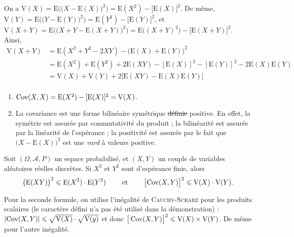 \begin{prv}
	On a $\mathrm{V}(X) = \mathrm{E}\big(\big(X - \mathrm{E}(X)\big)^2\big) = \mathrm{E}(X^2) - \big[\mathrm{E}(X)\big]^2$. De même, $\mathrm{V}(Y) = \mathrm{E}\big(\big(Y - \mathrm{E}(Y)\big)^2\big) = \mathrm{E}(Y^2) - \big[\mathrm{E}(Y)\big]^2$, et $\mathrm{V}(X+Y) = \mathrm{E}\big(\big(X+Y - \mathrm{E}(X+Y)\big)^2\big) = \mathrm{E}\big((X+Y)^2\big) - \big[\mathrm{E}(X+Y)\big]^2$.
	Ainsi,
	\begin{align*}
		\mathrm{V}(X + Y) &= \mathrm{E}(X^2 + Y^2 - 2 XY) - \big(\mathrm{E}(X) + \mathrm{E}(Y)\big)^2  \\
		&= \mathrm{E}(X^2) + \mathrm{E}(Y^2) +2\mathrm{E}(XY) - [\mathrm{E}(X)]^2 - [\mathrm{E}(Y)]^2 - 2\mathrm{E}(X)\mathrm{E}(Y)\\
		&= \mathrm{V}(X) + \mathrm{V}(Y) + 2\big[\mathrm{E}(XY) - \mathrm{E}(X) \mathrm{E}(Y)\big] \\
	\end{align*}
\end{prv}

\begin{rmk}
	\begin{enumerate}
		\item $\operatorname{Cov}(X, X) = \mathrm{E}(X^2) - [\mathrm{E}(X)]^2 = \mathrm{V}(X)$.
		\item La covariance est une forme bilinéaire symétrique \st{définie} positive. En effet, la symétrie est assurée par commutativité du produit ; la bilinéarité est assurée par la linéarité de l'espérance ; la positivité est assurée par le fait que $\big(X-\mathrm{E}(X)\big)^2$ est une \textit{vard} à valeurs positive.
	\end{enumerate}
\end{rmk}

\begin{prop}
	Soit $(\Omega, \mathcal{A}, P)$\/ un espace probabilisé, et $(X, Y)$ un couple de variables aléatoires réelles discrètes. Si $X^2$ et $Y^2$ sont d'espérance finie, alors \[
		\big(\mathrm{E}(XY)\big)^2 \leqslant \mathrm{E}(X^2) \cdot \mathrm{E}(Y^2)
		\quad\quad \text{ et }\quad\quad
		\big[{\operatorname{Cov}(X,Y)}\big]^2 \leqslant \mathrm{V}(X) \cdot \mathrm{V}(Y)
	.\]
\end{prop}

\begin{prv}
	Pour la seconde formule, on utilise l'inégalité de \textsc{Cauchy-Scharz} pour les produits scalaires (le caractère défini n'a pas été utilisé dans la démonstration) : $|{\operatorname{Cov}(X,Y)}| \leqslant \sqrt{\mathrm{V}(X)} \cdot \sqrt{\mathrm{V}(y)}$ et donc $\big[\operatorname{Cov}(X,Y)\big]^2 \leqslant \mathrm{V}(X) \times \mathrm{V}(Y)$. De même pour l'autre inégalité.
\end{prv}

